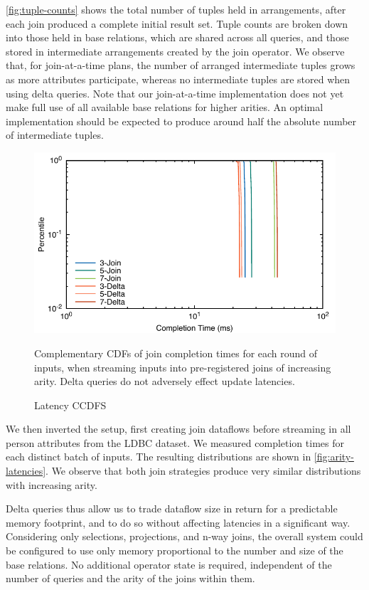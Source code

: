 \documentclass[../catalog.tex]{subfiles}
\begin{document}
\autoref{fig:tuple-counts} shows the total number of tuples held in
arrangements, after each join produced a complete initial result
set. Tuple counts are broken down into those held in base relations,
which are shared across all queries, and those stored in intermediate
arrangements created by the join operator. We observe that, for
join-at-a-time plans, the number of arranged intermediate tuples grows
as more attributes participate, whereas no intermediate tuples are
stored when using delta queries. Note that our join-at-a-time
implementation does not yet make full use of all available base
relations for higher arities. An optimal implementation should be
expected to produce around half the absolute number of intermediate
tuples.

\begin{figure}[h!]
  \includegraphics[width=1.0\linewidth]{results/join-state/out/all_cdfs}
  \caption{Latency CCDFS}
  \label{fig:arity-latencies}
  \medskip
  \small

  Complementary CDFs of join completion times for each round of
  inputs, when streaming inputs into pre-registered joins of
  increasing arity. Delta queries do not adversely effect update
  latencies.
\end{figure}

We then inverted the setup, first creating join dataflows before
streaming in all person attributes from the LDBC dataset. We measured
completion times for each distinct batch of inputs. The resulting
distributions are shown in \autoref{fig:arity-latencies}. We observe
that both join strategies produce very similar distributions with
increasing arity.

Delta queries thus allow us to trade dataflow size in return for a
predictable memory footprint, and to do so without affecting latencies
in a significant way. Considering only selections, projections, and
n-way joins, the overall system could be configured to use only memory
proportional to the number and size of the base relations. No
additional operator state is required, independent of the number of
queries and the arity of the joins within them.
\end{document}
